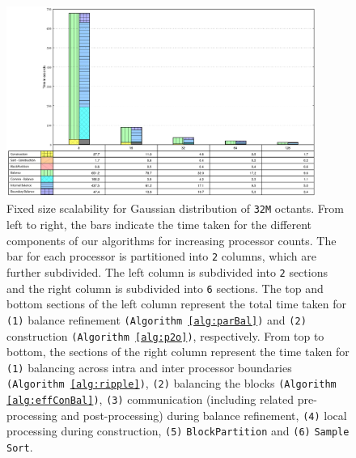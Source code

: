 \begin{figure}
  \begin{center}
    \includegraphics[width=0.9\textwidth]{images/fs32}
  \end{center}
  \caption{Fixed size scalability for Gaussian distribution of
  {\tt32M} octants. From left to right, the bars indicate the time
  taken for the different components of our algorithms for increasing
  processor counts. The bar for each processor is partitioned into
  {\tt2} columns, which are further subdivided. The left column is
  subdivided into {\tt2} sections and the right column is subdivided
  into {\tt6} sections. The top and bottom sections of the left column
  represent the total time taken for {\tt(1)} balance refinement
  {\tt(Algorithm \ref{alg:parBal})} and {\tt(2)} construction
  {\tt(Algorithm \ref{alg:p2o})}, respectively. From top to bottom,
  the sections of the right column represent the time taken for
  {\tt(1)} balancing across intra and inter processor boundaries
  {\tt(Algorithm \ref{alg:ripple})}, {\tt(2)} balancing the blocks
  {\tt(Algorithm \ref{alg:effConBal})}, {\tt(3)} communication
  (including related pre-processing and post-processing) during
  balance refinement, {\tt(4)} local processing during construction,
  {\tt(5)} {\tt BlockPartition} and {\tt(6)} {\tt Sample Sort}.}
  \label{fig:fsM}
\end{figure}

